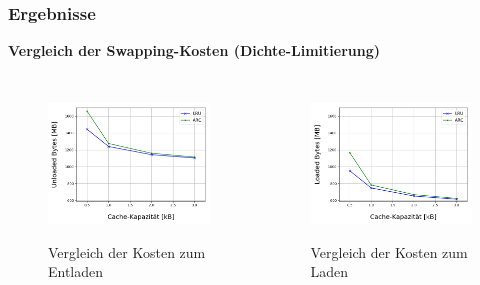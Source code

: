 \documentclass[presentation]{beamer}
\begin{document}
 
\begin{frame}
\frametitle{Ergebnisse}
\baselineskip
\color{dd-gray} \textbf{Vergleich der Swapping-Kosten (Dichte-Limitierung)} \color{black}
\begin{columns}[c] %
	\begin{figure}
		\centering
		\caption{Vergleich der Kosten zum Entladen}
		\includegraphics[width=1\linewidth]{figures/results/DensityLimitationSwapUnloadCosts.png}
		\label{fig:sub8}
	\end{figure}
	\begin{figure}
	\centering
	\caption{Vergleich der Kosten zum Laden}
	\includegraphics[width=1\linewidth]{figures/results/DensityLimitationSwapLoadCosts.png}
	\label{fig:sub9}
	\end{figure}
\end{columns}
\end{frame} 
\end{document}
